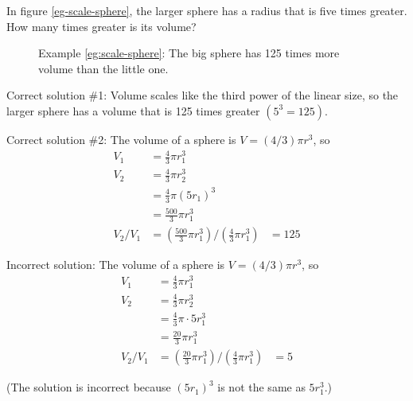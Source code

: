 \begin{exmp}\label{eg:scale-sphere}
In figure \ref{eg-scale-sphere}, the larger sphere has a radius that
is five times greater. How many times greater is its volume?




\usetikzlibrary{calc,fadings,decorations.pathreplacing}






\begin{figure}
\begin{center}
\end{center}
\caption{ \qquad  \qquad  Example \ref{eg:scale-sphere}: 
 The big sphere has 125 times more
 volume than the little one.
 }
\end{figure}


\vspace{1.5mm}

Correct solution \#1: Volume scales like the third power of
the linear size, so the larger sphere has a volume that is
125 times greater $(5^3=125)$.

Correct solution \#2: The volume of a sphere is $V=(4/3)\pi r^3$, so
\begin{align*}
 V_1 &= \frac{4}{3}\pi r_1^3 \\
 V_2 &= \frac{4}{3}\pi r_2^3 \\
 &= \frac{4}{3}\pi (5r_1)^3 \\
 &= \frac{500}{3}\pi r_1^3 \\
 V_2/V_1 &= \left( \frac{500}{3}\pi r_1^3 \right) / \left( \frac{4}{3}\pi r_1^3 \right)
 &= 125
\end{align*}

Incorrect solution: The volume of a sphere is $V=(4/3)\pi r^3$, so
\begin{align*}
 V_1 &= \frac{4}{3}\pi r_1^3 \\
 V_2 &= \frac{4}{3}\pi r_2^3 \\
 &= \frac{4}{3}\pi \cdot 5r_1^3 \\
 &= \frac{20}{3}\pi r_1^3 \\
 V_2/V_1 &= \left( \frac{20}{3}\pi r_1^3 \right) / \left( \frac{4}{3}\pi r_1^3 \right)
 &= 5
\end{align*}

(The solution is incorrect because $(5r_1)^3$ is not the same as $5r_1^3$.)


\end{exmp}

